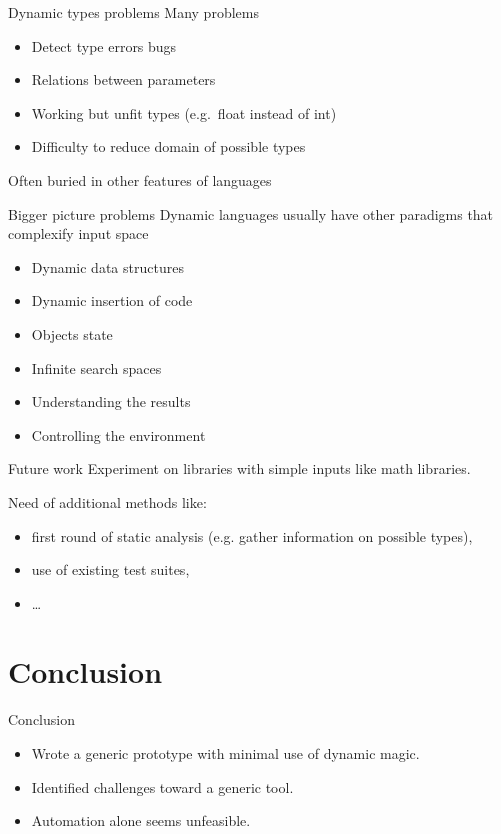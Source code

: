 \documentclass{beamer}
\begin{document}
\begin{frame}{Dynamic types problems}
  Many problems
  \begin{itemize}
    \item Detect type errors bugs
    \item Relations between parameters
    \item Working but unfit types (e.g.\ float instead of int)
    \item Difficulty to reduce domain of possible types
  \end{itemize}

  \vfill

  Often buried in other features of languages
\end{frame}

\begin{frame}{Bigger picture problems}
  Dynamic languages usually have other paradigms that complexify input space

  \begin{itemize}
    \item Dynamic data structures
    \item Dynamic insertion of code
    \item Objects state
    \item Infinite search spaces
    \item Understanding the results
    \item Controlling the environment
  \end{itemize}
\end{frame}

\begin{frame}{Future work}
  Experiment on libraries with simple inputs like math libraries.

  \vfill

  Need of additional methods like:
  \begin{itemize}
    \item first round of static analysis (e.g. gather information on possible types),
    \item use of existing test suites,
    \item \dots
  \end{itemize}
\end{frame}


\section*{Conclusion}

\begin{frame}{Conclusion}
  \begin{itemize}
    \item Wrote a generic prototype with minimal use of dynamic magic.
    \item Identified challenges toward a generic tool.
    \item Automation alone seems unfeasible.
  \end{itemize}
\end{frame}
\end{document}
